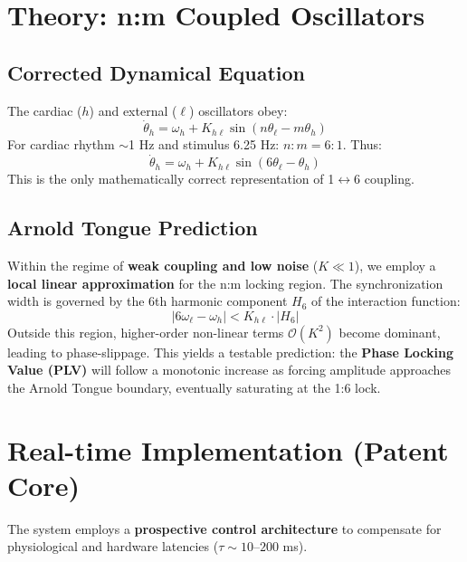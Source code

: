 \documentclass[fleqn,10pt]{article}
\begin{document}
\section{Theory: n:m Coupled Oscillators}
\subsection{Corrected Dynamical Equation}
The cardiac ($h$) and external ($\ell$) oscillators obey:
\begin{equation}
\dot{\theta}_h = \omega_h + K_{h\ell}\sin(n\theta_\ell - m\theta_h)
\end{equation}
For cardiac rhythm $\sim$1 Hz and stimulus 6.25 Hz: $n:m = 6:1$. Thus:
\begin{equation}
\dot{\theta}_h = \omega_h + K_{h\ell}\sin(6\theta_\ell - \theta_h)
\end{equation}
This is the only mathematically correct representation of 1$\leftrightarrow$6 coupling.

\subsection{Arnold Tongue Prediction}
Within the regime of \textbf{weak coupling and low noise} ($K \ll 1$), we employ a \textbf{local linear approximation} for the n:m locking region. The synchronization width is governed by the 6th harmonic component $H_6$ of the interaction function:
\begin{equation}
|6\omega_\ell - \omega_h| < K_{h\ell} \cdot |H_6|
\end{equation}
Outside this region, higher-order non-linear terms $\mathcal{O}(K^2)$ become dominant, leading to phase-slippage. This yields a testable prediction: the \textbf{Phase Locking Value (PLV)} will follow a monotonic increase as forcing amplitude approaches the Arnold Tongue boundary, eventually saturating at the 1:6 lock.

\section{Real-time Implementation (Patent Core)}
The system employs a \textbf{prospective control architecture} to compensate for physiological and hardware latencies ($\tau \sim 10$--$200$ ms).
\end{document}
